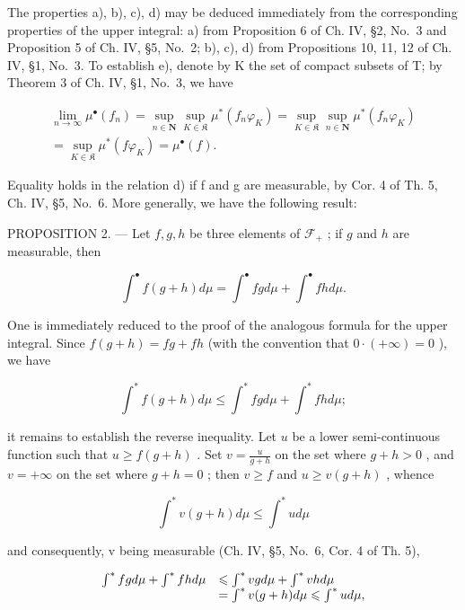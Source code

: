 The properties a), b), c), d) may be deduced immediately from the corresponding properties of the upper integral: a) from Proposition 6 of Ch. IV, §2, No.~3 and Proposition 5 of Ch. IV, §5, No.~2; b), c), d) from Propositions 10, 11, 12 of Ch. IV, §1, No.~3. To establish e), denote by K the set of compact subsets of T; by Theorem 3 of Ch. IV, §1, No.~3, we have

\[
\begin{array}{c} \lim _ {n \to \infty} \mu^ {\bullet} (f _ {n}) = \sup _ {n \in \mathbf {N}} \sup _ {K \in \mathfrak {K}} \mu^ {*} (f _ {n} \varphi_ {K}) = \sup _ {K \in \mathfrak {K}} \sup _ {n \in \mathbf {N}} \mu^ {*} (f _ {n} \varphi_ {K}) \\ = \sup _ {K \in \mathfrak {K}} \mu^ {*} (f \varphi_ {K}) = \mu^ {\bullet} (f)  . \end{array}
\]

Equality holds in the relation d) if f and g are measurable, by Cor. 4 of Th. 5, Ch. IV, §5, No.~6. More generally, we have the following result:

PROPOSITION 2. --- Let \(f,g,h\) be three elements of \(\mathcal{F}_{+}\) ; if \(g\) and \(h\) are measurable, then

\[
\int^ {\bullet} f (g + h) d \mu = \int^ {\bullet} f g d \mu + \int^ {\bullet} f h d \mu .\tag{2}
\]

One is immediately reduced to the proof of the analogous formula for the upper integral. Since \(f(g + h) = fg + fh\) (with the convention that \(0 \cdot (+\infty) = 0\) ), we have

\[
\int^ {*} f (g + h) d \mu \leqslant \int^ {*} f g d \mu + \int^ {*} f h d \mu ;
\]

it remains to establish the reverse inequality. Let \(u\) be a lower semi-continuous function such that \(u \geqslant f(g + h)\) . Set \(v = \frac{u}{g + h}\) on the set where \(g + h > 0\) , and \(v = +\infty\) on the set where \(g + h = 0\) ; then \(v \geqslant f\) and \(u \geqslant v(g + h)\) , whence

\[
\int^ {*} v (g + h) d \mu \leqslant \int^ {*} u d \mu
\]

and consequently, v being measurable (Ch. IV, §5, No.~6, Cor. 4 of Th. 5),

\[
\begin{array}{r l} \int^ {*} f g d \mu + \int^ {*} f h d \mu & \leqslant \int^ {*} v g d \mu + \int^ {*} v h d \mu \\ & = \int^ {*} v (g + h) d \mu \leqslant \int^ {*} u d \mu , \end{array}
\]

